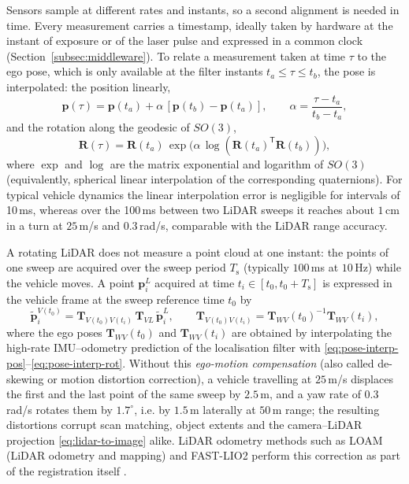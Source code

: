 Sensors sample at different rates and instants, so a second alignment is needed in time. Every measurement carries a timestamp, ideally taken by hardware at the instant of exposure or of the laser pulse and expressed in a common clock (Section~\ref{subsec:middleware}). To relate a measurement taken at time $\tau$ to the ego pose, which is only available at the filter instants $t_{a}\le\tau\le t_{b}$, the pose is interpolated: the position linearly,
\begin{equation}
\mathbf{p}(\tau)=\mathbf{p}(t_{a})+\alpha\,[\mathbf{p}(t_{b})-\mathbf{p}(t_{a})],\qquad \alpha=\frac{\tau-t_{a}}{t_{b}-t_{a}},
\label{eq:pose-interp-pos}
\end{equation}
and the rotation along the geodesic of $SO(3)$,
\begin{equation}
\mathbf{R}(\tau)=\mathbf{R}(t_{a})\,\exp\!\big(\alpha\,\log(\mathbf{R}(t_{a})^{\mathsf T}\mathbf{R}(t_{b}))\big),
\label{eq:pose-interp-rot}
\end{equation}
where $\exp$ and $\log$ are the matrix exponential and logarithm of $SO(3)$ (equivalently, spherical linear interpolation of the corresponding quaternions). For typical vehicle dynamics the linear interpolation error is negligible for intervals of 10\,ms, whereas over the 100\,ms between two LiDAR sweeps it reaches about $1$\,cm in a turn at $25$\,m/s and $0.3$\,rad/s, comparable with the LiDAR range accuracy.

A rotating LiDAR does not measure a point cloud at one instant: the points of one sweep are acquired over the sweep period $T_{\mathrm{s}}$ (typically $100$\,ms at $10$\,Hz) while the vehicle moves. A point $\mathbf{p}_{i}^{L}$ acquired at time $t_{i}\in[t_{0},t_{0}+T_{\mathrm{s}}]$ is expressed in the vehicle frame at the sweep reference time $t_{0}$ by
\begin{equation}
\tilde{\mathbf{p}}_{i}^{V(t_{0})}=\mathbf{T}_{V(t_{0})V(t_{i})}\,\mathbf{T}_{V\!L}\,\tilde{\mathbf{p}}_{i}^{L},
\qquad
\mathbf{T}_{V(t_{0})V(t_{i})}=\mathbf{T}_{W\!V}(t_{0})^{-1}\mathbf{T}_{W\!V}(t_{i}),
\label{eq:motion-compensation}
\end{equation}
where the ego poses $\mathbf{T}_{W\!V}(t_{0})$ and $\mathbf{T}_{W\!V}(t_{i})$ are obtained by interpolating the high-rate IMU--odometry prediction of the localisation filter with \eqref{eq:pose-interp-pos}--\eqref{eq:pose-interp-rot}. Without this \emph{ego-motion compensation} (also called de-skewing or motion distortion correction), a vehicle travelling at $25$\,m/s displaces the first and the last point of the same sweep by $2.5$\,m, and a yaw rate of $0.3$\,rad/s rotates them by $1.7^{\circ}$, i.e. by $1.5$\,m laterally at $50$\,m range; the resulting distortions corrupt scan matching, object extents and the camera--LiDAR projection \eqref{eq:lidar-to-image} alike. LiDAR odometry methods such as LOAM (LiDAR odometry and mapping) and FAST-LIO2 perform this correction as part of the registration itself \cite{zhang2014_loam,xu2022_fastlio2}.

